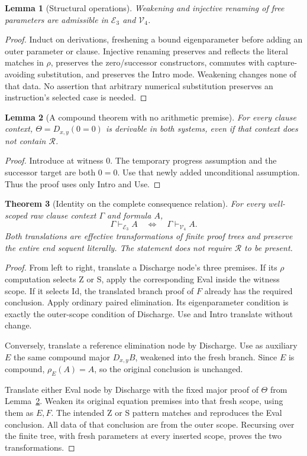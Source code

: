 \documentclass[11pt,letterpaper]{article}
\newtheorem{theorem}{Theorem}[section]
\newtheorem{lemma}[theorem]{Lemma}
\theoremstyle{definition}\newtheorem{definition}[theorem]{Definition}
\theoremstyle{remark}\newtheorem{remark}[theorem]{Remark}
\begin{document}
\begin{lemma}[Structural operations]
\label{lem:raw-structural}
Weakening and injective renaming of free parameters are admissible in
$\mathcal E_3$ and $\mathcal V_4$.
\end{lemma}
\begin{proof}
Induct on derivations, freshening a bound eigenparameter before adding an
outer parameter or clause. Injective renaming preserves and reflects the
literal matches in $\rho$, preserves the zero/successor constructors,
commutes with capture-avoiding substitution, and preserves the Intro mode.
Weakening changes none of that data. No assertion that arbitrary numerical
substitution preserves an instruction's selected case is needed.
\end{proof}

\begin{lemma}[A compound theorem with no arithmetic premise]
\label{lem:theta}
For every clause context, $\Theta=D_{x,y}(0=0)$ is derivable in both systems,
even if that context does not contain $\mathcal R$.
\end{lemma}
\begin{proof}
Introduce at witness $0$. The temporary progress assumption and the
successor target are both $0=0$. Use that newly added unconditional
assumption. Thus the proof uses only Intro and Use.
\end{proof}

\begin{theorem}[Identity on the complete consequence relation]
\label{thm:raw-equivalence}
For every well-scoped raw clause context $\Gamma$ and formula $A$,
\[
               \Gamma\vdash_{\mathcal E_3}A
               \quad\Longleftrightarrow\quad
               \Gamma\vdash_{\mathcal V_4}A.
\]
Both translations are effective transformations of finite proof trees and
preserve the entire end sequent literally. The statement does not require
$\mathcal R$ to be present.
\end{theorem}
\begin{proof}
From left to right, translate a Discharge node's three premises. If its
$\rho$ computation selects Z or S, apply the corresponding Eval inside the
witness scope. If it selects Id, the translated branch proof of $F$ already
has the required conclusion. Apply ordinary paired elimination. Its
eigenparameter condition is exactly the outer-scope condition of Discharge.
Use and Intro translate without change.

Conversely, translate a reference elimination node by Discharge. Use as
auxiliary $E$ the same compound major $D_{x,y}B$, weakened into the fresh
branch. Since $E$ is compound, $\rho_E(A)=A$, so the original conclusion
is unchanged.

Translate either Eval node by Discharge with the fixed major proof of
$\Theta$ from Lemma~\ref{lem:theta}. Weaken its original equation premises
into that fresh scope, using them as $E,F$. The intended Z or S pattern
matches and reproduces the Eval conclusion. All data of that conclusion
are from the outer scope. Recursing over the finite tree, with fresh
parameters at every inserted scope, proves the two transformations.
\end{proof}
\end{document}
